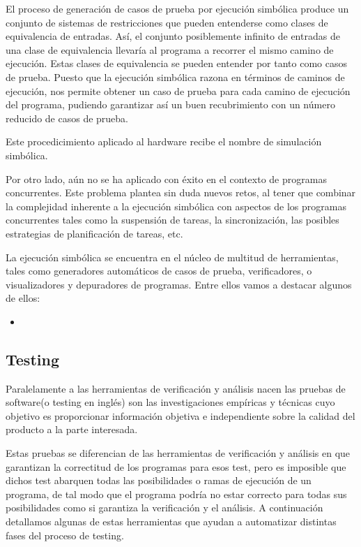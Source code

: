 El proceso de generaci\'on de casos de prueba por ejecuci\'on simb\'olica produce un conjunto de sistemas de restricciones que pueden entenderse como clases de equivalencia de entradas. As\'i, el conjunto posiblemente infinito de entradas de una clase de equivalencia llevar\'ia al programa a recorrer el mismo camino de ejecuci\'on. Estas clases de equivalencia se pueden entender por tanto como casos de prueba. Puesto que la ejecuci\'on simb\'olica razona en t\'erminos de caminos de ejecuci\'on, nos permite obtener un caso de prueba para cada camino de ejecuci\'on del programa, pudiendo garantizar as\'i un buen recubrimiento con un n\'umero reducido de casos de prueba.

Este procedicimiento aplicado al hardware recibe el nombre de simulaci\'on simb\'olica.

Por otro lado, a\'un no se ha aplicado con \'exito en el contexto de programas concurrentes. Este problema plantea sin duda nuevos retos, al tener que combinar la complejidad inherente a la ejecuci\'on simb\'olica con aspectos de los programas concurrentes tales como la suspensi\'on de tareas, la sincronizaci\'on, las posibles estrategias de planificaci\'on de tareas, etc.

La ejecuci\'on simb\'olica se encuentra en el n\'ucleo de multitud de herramientas, tales como generadores autom\'aticos de casos de prueba, verificadores, o visualizadores y depuradores de programas. Entre ellos vamos a destacar algunos de ellos:

\begin{itemize}
\item \textbf{}
\end{itemize}


\subsection{Testing}

Paralelamente a las herramientas de verificaci\'on y an\'alisis nacen las pruebas de software(o testing en ingl\'es) son las investigaciones emp\'iricas y t\'ecnicas cuyo objetivo es proporcionar informaci\'on objetiva e independiente sobre la calidad del producto a la parte interesada.  

Estas pruebas se diferencian de las herramientas de verificaci\'on y an\'alisis en que garantizan la correctitud de los programas para esos test, pero es imposible que dichos test abarquen todas las posibilidades o ramas de ejecuci\'on de un programa, de tal modo que el programa podr\'ia no estar correcto para todas sus posibilidades como si garantiza la verificaci\'on y el an\'alisis. A continuaci\'on detallamos algunas de estas herramientas que ayudan a automatizar distintas fases del proceso de testing.


